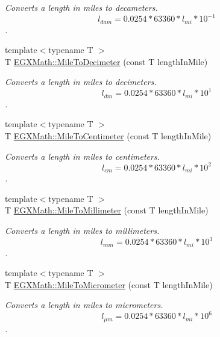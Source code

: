 \begin{DoxyCompactItemize}
\begin{DoxyCompactList}\small\item\em Converts a length in miles to decameters. \[ l_{dam}=0.0254 * 63360 * l_{mi} * 10^{-1} \]. \end{DoxyCompactList}\item 
{\footnotesize template$<$typename T $>$ }\\T \mbox{\hyperlink{group___e_g_x_math-_conversions-_length_conversions-_imperial-_mile-_s_i_ga678ca464b305b9425fbec0b1f53fb983}{E\+G\+X\+Math\+::\+Mile\+To\+Decimeter}} (const T length\+In\+Mile)
\begin{DoxyCompactList}\small\item\em Converts a length in miles to decimeters. \[ l_{dm}=0.0254 * 63360 * l_{mi} * 10^{1} \]. \end{DoxyCompactList}\item 
{\footnotesize template$<$typename T $>$ }\\T \mbox{\hyperlink{group___e_g_x_math-_conversions-_length_conversions-_imperial-_mile-_s_i_gae846539455d87b5bc7b4af82c172f184}{E\+G\+X\+Math\+::\+Mile\+To\+Centimeter}} (const T length\+In\+Mile)
\begin{DoxyCompactList}\small\item\em Converts a length in miles to centimeters. \[ l_{cm}=0.0254 * 63360 * l_{mi} * 10^{2} \]. \end{DoxyCompactList}\item 
{\footnotesize template$<$typename T $>$ }\\T \mbox{\hyperlink{group___e_g_x_math-_conversions-_length_conversions-_imperial-_mile-_s_i_gaaaf6dd30f919daf99f99e99422a8e547}{E\+G\+X\+Math\+::\+Mile\+To\+Millimeter}} (const T length\+In\+Mile)
\begin{DoxyCompactList}\small\item\em Converts a length in miles to millimeters. \[ l_{mm}=0.0254 * 63360 * l_{mi} * 10^{3} \]. \end{DoxyCompactList}\item 
{\footnotesize template$<$typename T $>$ }\\T \mbox{\hyperlink{group___e_g_x_math-_conversions-_length_conversions-_imperial-_mile-_s_i_ga59355064bc6419c5dc24f89bb13ec070}{E\+G\+X\+Math\+::\+Mile\+To\+Micrometer}} (const T length\+In\+Mile)
\begin{DoxyCompactList}\small\item\em Converts a length in miles to micrometers. \[ l_{\mu m}=0.0254 * 63360 * l_{mi} * 10^{6} \]. \end{DoxyCompactList}\item 

\end{DoxyCompactItemize}
